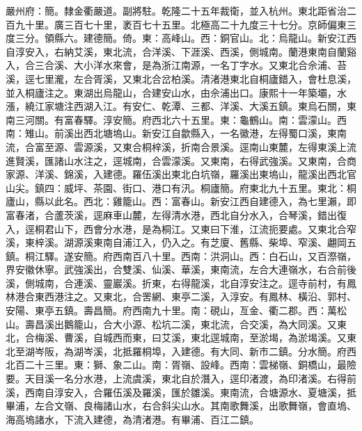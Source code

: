\begin{pinyinscope}
嚴州府：簡。隸金衢嚴道。副將駐。乾隆二十五年裁衛，並入杭州。東北距省治二百九十里。廣三百七十里，袤百七十五里。北極高二十九度三十七分。京師偏東三度三分。領縣六。建德簡。倚。東：高峰山。西：銅官山。北：烏龍山。新安江西自淳安入，右納艾溪，東北流，合洋溪、下涯溪、西溪，側城南。蘭港東南自蘭谿入，合三合溪、大小洋水來會，是為浙江南源，一名丁字水。又東北合佘浦、苔溪，逕七里瀧，左合胥溪，又東北合岔柏溪。清渚港東北自桐廬錯入，會杜息溪，並入桐廬注之。東湖出烏龍山，合建安山水，由佘浦出口。康熙十一年築壩，水漲，繞江家塘注西湖入江。有安仁、乾潭、三都、洋溪、大溪五鎮。東烏石關，東南三河關。有富春驛。淳安簡。府西北六十五里。東：龜鶴山。南：雲濛山。西南：雉山。前溪出西北塘塢山。新安江自歙縣入，一名徽港，左得蜀口溪，東南流，合富至源、雲源溪，又東合桐梓溪，折南合景溪。逕南山東麓，左得東溪上流進賢溪，匯諸山水注之，逕城南，合雲濛溪。又東南，右得武強溪。又東南，合商家源、洋溪、錦溪，入建德。羅伍溪出東北白坑嶺，羅溪出東塢山，龍溪出西北官山尖。鎮四：威坪、茶園、街口、港口有汛。桐廬簡。府東北九十五里。東北：桐廬山，縣以此名。西北：雞籠山。西：富春山。新安江西自建德入，為七里瀨，即富春渚，合蘆茨溪，逕麻車山麓，左得清水港，西北自分水入，合琴溪，錯出復入，逕桐君山下，西會分水港，是為桐江。又東曰下淮，江流扼要處。又東北合窄溪，東梓溪。湖源溪東南自浦江入，仍入之。有芝廈、舊縣、柴埠、窄溪、翽岡五鎮。桐江驛。遂安簡。府西南百八十里。西南：洪洞山。西：白石山，又百漈嶺，界安徽休寧。武強溪出，合雙溪、仙溪、華溪，東南流，左合大連嶺水，右合前後溪，側城南，合連溪、靈巖溪。折東，右得龍溪，北自淳安注之。逕寺前村，有鳳林港合東西港注之。又東北，合罟網、東亭二溪，入淳安。有鳳林、橫沿、郭村、安陽、東亭五鎮。壽昌簡。府西南九十里。南：硯山，亙金、衢二郡。西：萬松山。壽昌溪出鵝籠山，合大小源、松坑二溪，東北流，合交溪，為大同溪。又東北，合梅溪、曹溪，自城西而東，曰艾溪，東北逕城南，至淤堨，為淤堨溪。又東北至湖岑阪，為湖岑溪，北抵羅桐埠，入建德。有大同、新巿二鎮。分水簡。府西北百二十三里。東：獅、象二山。南：胥嶺、設峰。西南：雲梯嶺、銅橋山，最險要。天目溪一名分水港，上流虞溪，東北自於潛入，逕印渚渡，為印渚溪。右得前溪，西南自淳安入，合羅伍溪及羅溪，匯於雛溪。東南流，合塘源水、夏塘溪，抵畢浦，左合文嶺、良梅諸山水，右合斜尖山水。其南歌舞溪，出歌舞嶺，會直塢、海高塢諸水，下流入建德，為清渚港。有畢浦、百江二鎮。


\end{pinyinscope}
